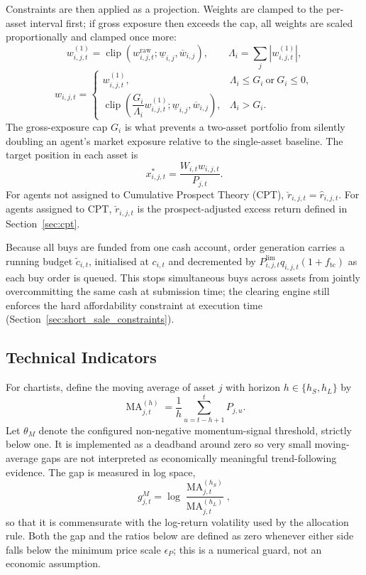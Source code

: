 \documentclass[12pt, a4paper]{article}
\DeclareMathOperator{\clip}{clip}
\DeclareMathOperator{\MA}{MA}
\begin{document}
    Constraints are then applied as a projection. Weights are clamped to the
    per-asset interval first; if gross exposure then exceeds the cap, all weights
    are scaled proportionally and clamped once more:
    \[
        w_{i,j,t}^{(1)}=\clip\!\left(w_{i,j,t}^{\mathrm{raw}};\underline w_{i,j},\overline w_{i,j}\right),
        \qquad
        \Lambda_i=\sum_{j}\left|w_{i,j,t}^{(1)}\right|,
    \]
    \[
        w_{i,j,t}=
        \begin{cases}
            w_{i,j,t}^{(1)}, & \Lambda_i\le G_i \ \text{or}\ G_i\le 0,\\[1.2ex]
            \clip\!\left(\dfrac{G_i}{\Lambda_i}w_{i,j,t}^{(1)};\underline w_{i,j},\overline w_{i,j}\right), & \Lambda_i>G_i.
        \end{cases}
    \]
    The gross-exposure cap \(G_i\) is what prevents a two-asset portfolio from
    silently doubling an agent's market exposure relative to the single-asset
    baseline. The target position in each asset is
    \[
        x_{i,j,t}^{\ast}=\frac{W_{i,t}w_{i,j,t}}{P_{j,t}}.
    \]
    For agents not assigned to Cumulative Prospect Theory (CPT),
    \(\breve r_{i,j,t}=\hat r_{i,j,t}\). For agents assigned to CPT,
    \(\breve r_{i,j,t}\) is the prospect-adjusted excess return defined in
    Section~\ref{sec:cpt}.

    Because all buys are funded from one cash account, order generation carries a
    running budget \(\tilde c_{i,t}\), initialised at \(c_{i,t}\) and decremented
    by \(P_{i,j,t}^{\text{lim}}q_{i,j,t}(1+f_{\mathrm{tc}})\) as each buy order is
    queued. This stops simultaneous buys across assets from jointly
    overcommitting the same cash at submission time; the clearing engine still
    enforces the hard affordability constraint at execution time
    (Section~\ref{sec:short_sale_constraints}).

    \subsection{Technical Indicators}

    For chartists, define the moving average of asset \(j\) with horizon
    \(h\in\{h_S,h_L\}\) by
    \[
        \MA_{j,t}^{(h)}=\frac{1}{h}\sum_{u=t-h+1}^{t}P_{j,u}.
    \]
    Let \(\theta_M\) denote the configured non-negative momentum-signal threshold,
    strictly below one. It is
    implemented as a deadband around zero so very small moving-average gaps are not
    interpreted as economically meaningful trend-following evidence. The gap is
    measured in log space,
    \[
        g_{j,t}^M=\log\frac{\MA_{j,t}^{(h_S)}}{\MA_{j,t}^{(h_L)}},
    \]
    so that it is commensurate with the log-return volatility used by the
    allocation rule. Both the gap and the ratios below are defined as zero
    whenever either side falls below the minimum price scale \(\epsilon_P\); this
    is a numerical guard, not an economic assumption.
\end{document}
